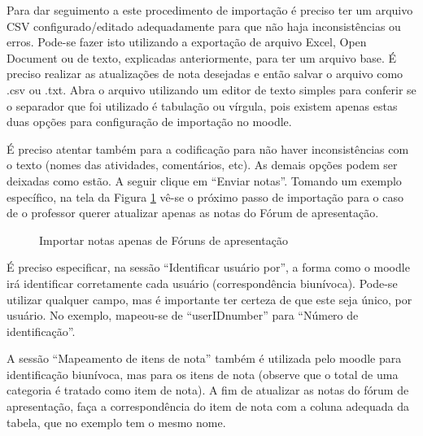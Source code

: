 Para dar seguimento a este procedimento de importação é preciso ter um arquivo CSV configurado/editado adequadamente para que não haja inconsistências ou erros. Pode-se fazer isto utilizando a exportação de arquivo Excel, Open Document ou de texto, explicadas anteriormente, para ter um arquivo base. É preciso realizar as atualizações de nota desejadas e então salvar o arquivo como .csv ou .txt. Abra o arquivo utilizando um editor de texto simples para conferir se o separador que foi utilizado é tabulação ou vírgula, pois existem apenas estas duas opções para configuração de importação no moodle.

É preciso atentar também para a codificação para não haver inconsistências com o texto (nomes das atividades, comentários, etc). As demais opções podem ser deixadas como estão. A seguir clique em “Enviar notas”. Tomando um exemplo específico, na tela da Figura \ref{fig:cap6_40} vê-se o próximo passo de importação para o caso de o professor querer atualizar apenas as notas do Fórum de apresentação.

\begin{figure}[!htbp]
 \begin{center}
  \caption{Importar notas apenas de Fóruns de apresentação}
  \label{fig:cap6_40}
 \end{center}
\end{figure}

É preciso especificar, na sessão “Identificar usuário por”, a forma como o moodle irá identificar corretamente cada usuário (correspondência biunívoca).  Pode-se utilizar qualquer campo, mas é importante ter certeza de que este seja único, por usuário. No exemplo, mapeou-se de “userIDnumber” para “Número de identificação”. 

A sessão “Mapeamento de itens de nota” também é utilizada pelo moodle para identificação biunívoca, mas para os itens de nota (observe que o total de uma categoria é tratado como item de nota). A fim de atualizar as notas do fórum de apresentação, faça a correspondência do item de nota com a coluna adequada da tabela, que no exemplo tem o mesmo nome.

